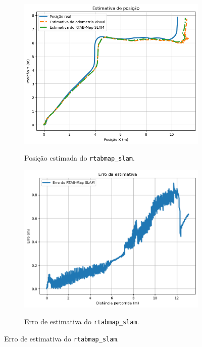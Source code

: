 \documentclass[repeatfields,xlists,xpacks,oneside,yearsonly]{ufrgscca}
\begin{document}
\begin{figure}[H]
    \caption{Resultado do pacote \texttt{rtabmap\_slam}.}
    \label{fig:rtabmap_slam_result}
    \begin{subfigure}{0.5\linewidth}
        {
            \centering
            \caption{Posição estimada do \texttt{rtabmap\_slam}.}
            \label{fig:localization_rtabmap}
            \includegraphics[width=0.98\linewidth]{localization-rtabmap-new.png}\\
        }
    \end{subfigure}
    \begin{subfigure}{0.5\linewidth}
        {
            \centering
            \caption{Erro de estimativa do \texttt{rtabmap\_slam}.}
            \label{fig:localization_rtabmap_error}
            \includegraphics[width=0.98\linewidth]{localization-rtabmap-error-new.png}\\
        }
    \end{subfigure}
\end{figure}
\end{document}
